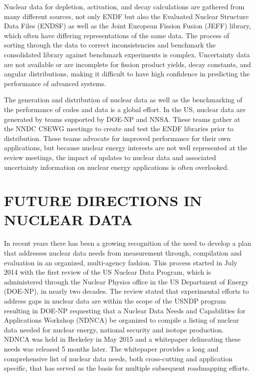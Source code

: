 \documentclass[letterpaper,draft]{ar-1col}
\begin{document}
Nuclear data for depletion, activation, and decay calculations are gathered from many different sources, not only ENDF but also the Evaluated Nuclear Structure Data Files (ENDSF) as well as the Joint European Fission Fusion (JEFF) library, which often have differing representations of the same data. The process of sorting through the data to correct inconsistencies and benchmark the consolidated library against benchmark experiments is complex.
Uncertainty data are not available or are incomplete for fission product yields, decay constants, and angular distributions, making it difficult to have high confidence in predicting the performance of advanced systems.

The generation and distribution of nuclear data as well as the benchmarking of the performance of codes and data is a global effort. In the US, nuclear data are generated by teams supported by DOE-NP and NNSA. These teams gather at the NNDC CSEWG meetings to create and test the ENDF libraries prior to distribution. These teams advocate for improved performance for their own applications, but because nuclear energy interests are not well represented at the review meetings, the impact of updates to nuclear data and associated uncertainty information on nuclear energy applications is often overlooked.

\section{FUTURE DIRECTIONS IN NUCLEAR DATA}

In recent years there has been a growing recognition of the need to develop a plan that addresses nuclear data needs from measurement through, compilation and evaluation in an organized, multi-agency fashion.  This process started in July 2014 with the first review of the US Nuclear Data Program, which is administered through the Nuclear Physics office in the US Department of Energy (DOE-NP), in nearly two decades.  The review stated that experimental efforts to address gaps in nuclear data are within the scope of the USNDP program resulting in  DOE-NP requesting that a Nuclear Data Needs and Capabilities for Applications Workshop (NDNCA) be organized to compile a listing of nuclear data needed for nuclear energy, national security and isotope production.  NDNCA was held in Berkeley in May 2015 \cite{} and a whitepaper delineating these needs was released 5 months later.   The whitepaper provides a long and comprehensive list of nuclear data needs, both cross-cutting and application specific, that has served as the basis for multiple subsequent roadmapping efforts.
\end{document}
